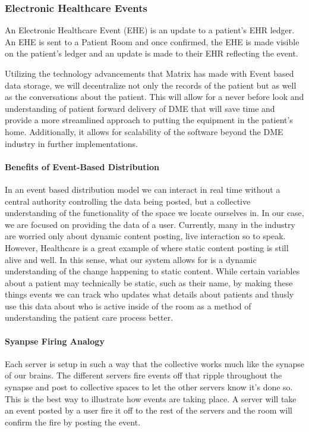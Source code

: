 \documentclass[12pt]{article}
\begin{document}
    \subsubsection{Electronic Healthcare Events}
    An Electronic Healthcare Event (EHE) is an update to a patient’s EHR ledger. An EHE is sent to a Patient Room and once confirmed, the EHE is made visible on the patient’s ledger and an update is made to their EHR reflecting the event.

    Utilizing the technology advancements that Matrix has made with Event based data storage, we will decentralize not only the records of the patient but as well as the conversations about the patient. This will allow for a never before look and understanding of patient forward delivery of DME that will save time and provide a more streamlined approach to putting the equipment in the patient's home. Additionally, it allows for scalability of the software beyond the DME industry in further implementations.

      \paragraph{Benefits of Event-Based Distribution}
      In an event based distribution model we can interact in real time without a central authority controlling the data being posted, but a collective understanding of the functionality of the space we locate ourselves in. In our case, we are focused on providing the data of a user. Currently, many in the industry are worried only about dynamic content posting, live interaction so to speak. However, Healthcare is a great example of where static content posting is still alive and well. In this sense, what our system allows for is a dynamic understanding of the change happening to static content. While certain variables about a patient may technically be static, such as their name, by making these things events we can track who updates what details about patients and thusly use this data about who is active inside of the room as a method of understanding the patient care process better.

      \paragraph{Syanpse Firing Analogy}
      Each server is setup in such a way that the collective works much like the synapse of our brains. The different servers fire events off that ripple throughout the synapse and post to collective spaces to let the other servers know it’s done so. This is the best way to illustrate how events are taking place. A server will take an event posted by a user fire it off to the rest of the servers and the room will confirm the fire by posting the event.
\end{document}

